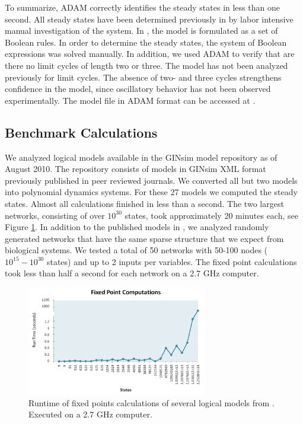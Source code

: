 \documentclass[11pt]{amsart}
\begin{document}
To summarize, ADAM correctly identifies the steady states
in less than one second. All steady states have been determined previously in \cite{AO} by labor intensive manual investigation of the system. In \cite{AO}, the model is formulated as a set of Boolean rules. In order to determine the steady states, the system of Boolean expressions was solved manually.
In addition, we used ADAM to verify that are there no limit
cycles of length two or three. The model has not been analyzed previously for
limit cycles. The absence of two- and three cycles strengthens confidence in
the model, since oscillatory behavior has not been observed experimentally.
The model file in ADAM format can be accessed at \cite{DrosophilaModel}.
\subsection{Benchmark Calculations}
We analyzed logical models
available in the GINsim model repository \cite{GINsimRepo} as of August 2010. The
repository consists of models in GINsim XML format previously published in
peer reviewed journals. We converted all but two models into polynomial
dynamics systems. For these 27 models we computed the steady states. Almost all
calculations finished in less than a second. The two largest networks,
consisting of over $10^{30}$ states, took approximately 20 minutes each, see
Figure \ref{fig:chart}.
In addition to the published models in \cite{GINsimRepo}, we analyzed
randomly generated networks
that have the same sparse structure that we
expect from biological systems. We tested a total of 50 networks with
50-100 nodes ($10^{15} - 10^{30}$ states) and up to 2 inputs per variables. The
fixed point calculations took less than half a second for each network on
a 2.7 GHz computer.
\begin{figure}[htb]
\centering
\includegraphics[width=0.7\textwidth]{GINSimChart.png}
\caption{Runtime of fixed points calculations of several logical models from
\cite{GINsimRepo}. Executed on a 2.7 GHz computer.}
\label{fig:chart}
\end{figure}
 
\end{document}
